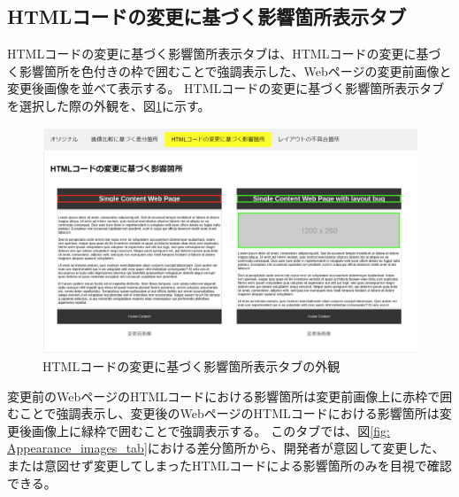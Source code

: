 \subsection{HTMLコードの変更に基づく影響箇所表示タブ}\label{subsec:html_tab}
HTMLコードの変更に基づく影響箇所表示タブは、HTMLコードの変更に基づく影響箇所を色付きの枠で囲むことで強調表示した、Webページの変更前画像と変更後画像を並べて表示する。
HTMLコードの変更に基づく影響箇所表示タブを選択した際の外観を、図\ref{fig: Appearance_html_tab}に示す。
\begin{figure}[tp]
    \begin{center}
        \includegraphics[width=1.0\columnwidth]{image/3_html_tab2.png}
        \caption{HTMLコードの変更に基づく影響箇所表示タブの外観}
        \label{fig: Appearance_html_tab}
    \end{center}
\end{figure}
変更前のWebページのHTMLコードにおける影響箇所は変更前画像上に赤枠で囲むことで強調表示し、変更後のWebページのHTMLコードにおける影響箇所は変更後画像上に緑枠で囲むことで強調表示する。
このタブでは、図\ref{fig: Appearance_images_tab}における差分箇所から、開発者が意図して変更した、または意図せず変更してしまったHTMLコードによる影響箇所のみを目視で確認できる。

